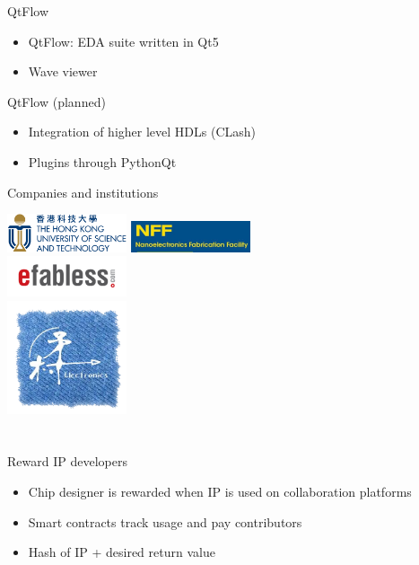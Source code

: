 \documentclass[9pt]{beamer}
\begin{document}
\begin{frame}{QtFlow}
	\begin{itemize}
        \setlength\itemsep{1em}
	\item QtFlow: EDA suite written in Qt5
	\item Wave viewer
	\end{itemize}    
\end{frame}

\begin{frame}{QtFlow (planned)}
	\begin{itemize}
        \setlength\itemsep{1em}
	\item Integration of higher level HDLs (CLash)
	\item Plugins through PythonQt
	\end{itemize}    
\end{frame}

\begin{frame}{Companies and institutions}
	\begin{center}
		\includegraphics[width=100pt]{HKUST_Logo.png}
		\includegraphics[width=100pt]{NFF.jpg}  \\
		\includegraphics[width=100pt]{efabless_logo.png} \\
		\includegraphics[width=100pt]{Lanceville.png}
	\end{center}
\end{frame}

\section[How]{}
\begin{frame}{Reward IP developers}
	\begin{itemize}
        \setlength\itemsep{1em}
		\item Chip designer is rewarded when IP is used on collaboration platforms
		\item Smart contracts track usage and pay contributors
		\item Hash of IP + desired return value
	\end{itemize}
\end{frame}
\end{document}
